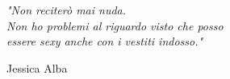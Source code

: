 \newlength\longest

\clearpage

\thispagestyle{empty}
\null\vfill

\settowidth{}
\begin{center}
    \parbox{\longest}{%
        \raggedright{\LARGE\itshape%
            "Non reciterò mai nuda.\\
            Non ho problemi al riguardo visto che posso\\
            essere sexy anche con i vestiti indosso."\par\bigskip
        }
        \raggedleft\Large{Jessica Alba}\par%
    }
\end{center}


\vfill\vfill

\clearpage
